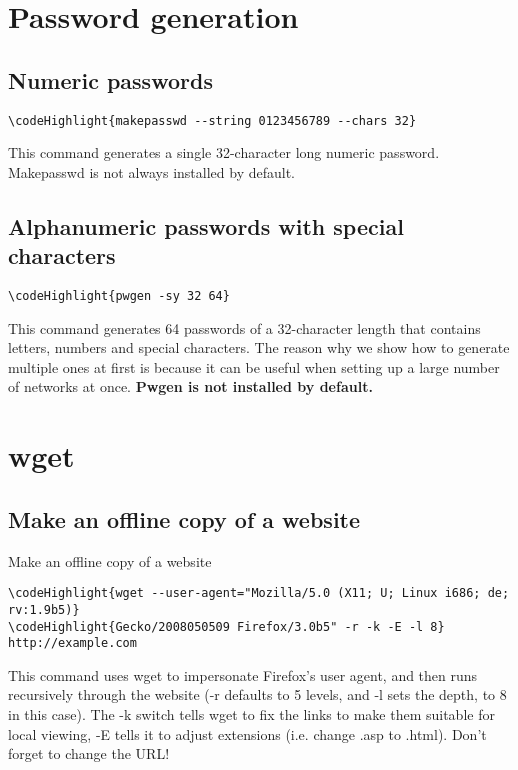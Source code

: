 \documentclass[12pt,a4paper]{article}
\begin{document}
\section{Password generation}
\label{Password generation}
\subsection{Numeric passwords}
\begin{Verbatim}[commandchars=\\\{\}]
\codeHighlight{makepasswd --string 0123456789 --chars 32}
\end{Verbatim}
This command generates a single 32-character long numeric password. Makepasswd is not always installed by default.

\subsection{Alphanumeric passwords with special characters}
\begin{Verbatim}[commandchars=\\\{\}]
\codeHighlight{pwgen -sy 32 64}
\end{Verbatim}
This command generates 64 passwords of a 32-character length that contains letters, numbers and special characters. The reason why we show how to generate multiple ones at first is because it can be useful when setting up a large number of networks at once.  \textbf{Pwgen is not installed by default.}

\section{wget}
\subsection{Make an offline copy of a website}
\label{}Make an offline copy of a website
\begin{Verbatim}[commandchars=\\\{\}]
\codeHighlight{wget --user-agent="Mozilla/5.0 (X11; U; Linux i686; de; rv:1.9b5)}
\codeHighlight{Gecko/2008050509 Firefox/3.0b5" -r -k -E -l 8} http://example.com
\end{Verbatim}
This command uses wget to impersonate Firefox's user agent, and then runs recursively through the website (-r defaults to 5 levels, and -l sets the depth, to 8 in this case). The -k switch tells wget to fix the links to make them suitable for local viewing, -E tells it to adjust extensions (i.e. change .asp to .html).  Don't forget to change the URL!
\end{document}

